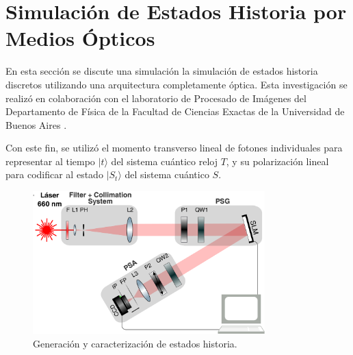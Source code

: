 \section{Simulación de Estados Historia por Medios Ópticos\label{sec:impl}}

En esta sección se discute una simulación
la simulación de estados historia discretos
utilizando una arquitectura completamente óptica.
Esta investigación se realizó
en colaboración con el laboratorio
de Procesado de Imágenes del Departamento de Física de la Facultad de Ciencias Exactas
de la Universidad de Buenos Aires \cite{OP}. 

Con este fin, se utilizó el momento transverso lineal 
de fotones individuales para representar al tiempo $|t\rangle$ del sistema cuántico reloj $T$, 
y su polarización lineal para codificar al estado $|S_t\rangle$ del sistema cuántico $S$.


\begin{figure}[htp]
\centering
\includegraphics[width=0.8\textwidth]{SETUP.jpg}
\caption{Generación y caracterización de estados historia.} 
\label{fig:setup}
\end{figure}

